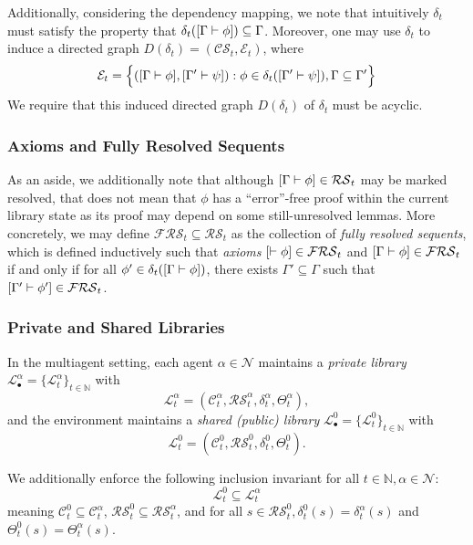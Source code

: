 Additionally, considering the dependency mapping, we note that intuitively $\delta_t$ must satisfy the property that $\delta_t([\Gamma \vdash \phi]) \subseteq \Gamma$. Moreover, one may use $\delta_t$ to induce a directed graph $D(\delta_t) = (\mathcal{CS}_t,\mathcal{E}_t)$, where 
\[\mathcal{E}_t = \Big\{([\Gamma\vdash \phi], [\Gamma' \vdash \psi]) : \phi \in \delta_t([\Gamma' \vdash \psi]), \Gamma\subseteq \Gamma'\Big\}\]
We require that this induced directed graph $D(\delta_t)$ of $\delta_t$ must be acyclic.

\subsubsection{Axioms and Fully Resolved Sequents}

As an aside, we additionally note that although $[\Gamma \vdash \phi] \in \mathcal{RS}_t$ may be marked resolved, that does not mean that $\phi$ has a ``error''-free proof within the current library state as its proof may depend on some still-unresolved lemmas. More concretely, we may define $\mathcal{FRS}_t \subseteq \mathcal{RS}_t$ as the collection of \textit{fully resolved sequents}, which is defined inductively such that \textit{axioms} $[\vdash \phi] \in \mathcal{FRS}_t$ and $[\Gamma \vdash \phi] \in \mathcal{FRS}_t$ if and only if for all $\phi' \in \delta_t([\Gamma \vdash \phi])$, there exists $\Gamma'\subseteq \Gamma$ such that $[\Gamma' \vdash \phi'] \in \mathcal{FRS}_t$.


\subsubsection{Private and Shared Libraries}
In the multiagent setting, each agent $\alpha\in\mathcal{N}$ maintains a \textit{private library} $\mathcal{L}_\bullet^\alpha = \{\mathcal{L}^\alpha_t\}_{t\in\mathbb{N}}$ with
\[
\mathcal{L}^\alpha_t = (\mathcal{C}^\alpha_t,\mathcal{RS}^\alpha_t,\delta^\alpha_t,\Theta_t^\alpha),
\]
and the environment maintains a \textit{shared (public) library} $\mathcal{L}_\bullet^0 = \{\mathcal{L}^0_t\}_{t\in\mathbb{N}}$ with
\[
\mathcal{L}^0_t = (\mathcal{C}^0_t,\mathcal{RS}^0_t,\delta^0_t, \Theta_t^0).
\]

We additionally enforce the following inclusion invariant for all $t \in \mathbb{N}, \alpha \in \mathcal{N}$:
\[
\mathcal{L}^0_t \subseteq \mathcal{L}^\alpha_t
\]
meaning $\mathcal{C}^0_t\subseteq \mathcal{C}^\alpha_t$, $\mathcal{RS}^0_t\subseteq \mathcal{RS}^\alpha_t$, and for all $s\in \mathcal{RS}_t^0, \delta^0_t(s) = \delta^\alpha_t(s)$ and $\Theta^0_t(s)=\Theta^\alpha_t(s)$.


